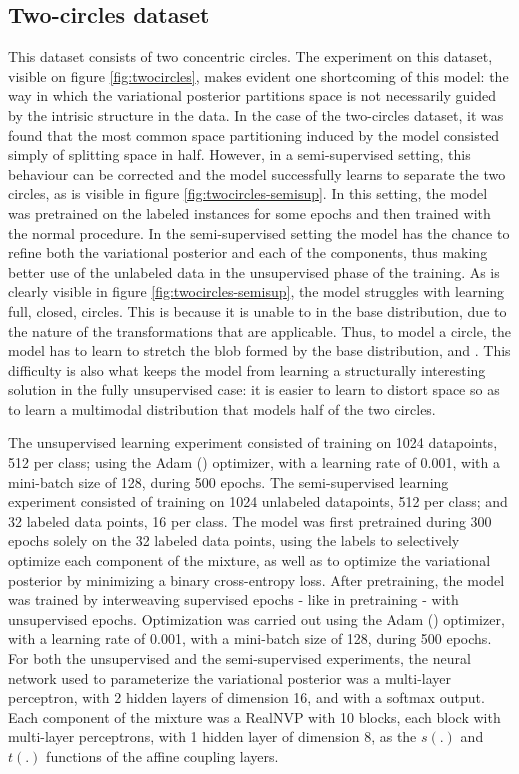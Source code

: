 \subsection{Two-circles dataset}
This dataset consists of two concentric circles. The experiment on this dataset,
visible on figure \ref{fig:twocircles}, makes evident one shortcoming of this
model: the way in which the variational posterior partitions space is
not necessarily guided by the intrisic structure in the data. In the case of
the two-circles dataset, it was found that the most common space partitioning
induced by the model consisted simply of splitting space in half. However, in
a semi-supervised setting, this behaviour can be corrected and the model
successfully learns to separate the two circles, as is visible in figure
\ref{fig:twocircles-semisup}. In this setting, the model was pretrained on
the labeled instances for some epochs and then trained with the normal procedure.
In the semi-supervised setting the model has the chance to refine both the
variational posterior and each of the components, thus making better use of
the unlabeled data in the unsupervised phase of the training. As is clearly
visible in figure \ref{fig:twocircles-semisup}, the model struggles with
learning full, closed, circles. This is because it is unable to 
in the base distribution, due to the nature of the transformations that are
applicable. Thus, to model a circle, the model has to learn to stretch the blob
formed by the base distribution, and . This difficulty
is also what keeps the model from learning a structurally interesting solution
in the fully unsupervised case: it is easier to learn to distort space so as to
learn a multimodal distribution that models half of the two circles.

The unsupervised learning experiment consisted of training on 1024 datapoints,
512 per class; using the Adam (\autocite{adam}) optimizer, with a learning rate
of 0.001, with a mini-batch size of 128, during 500 epochs.
The semi-supervised learning experiment consisted of training on 1024 unlabeled
datapoints, 512 per class; and 32 labeled data points, 16 per class. The model
was first pretrained during 300 epochs solely on the 32 labeled data points, using
the labels to selectively optimize each component of the mixture, as well as
to optimize the variational posterior by minimizing a binary cross-entropy loss.
After pretraining, the model was trained by interweaving supervised epochs - like
in pretraining - with unsupervised epochs. Optimization was carried out using the
Adam (\autocite{adam}) optimizer, with a learning rate of 0.001, with a mini-batch size
of 128, during 500 epochs.
For both the unsupervised and the semi-supervised experiments, the neural network
used to parameterize the variational posterior was a multi-layer perceptron, with
2 hidden layers of dimension 16, and with a softmax output. Each component of the
mixture was a RealNVP with 10 blocks, each block with multi-layer perceptrons,
with 1 hidden layer of dimension 8, as the $s(.)$ and $t(.)$ functions of the
affine coupling layers.

